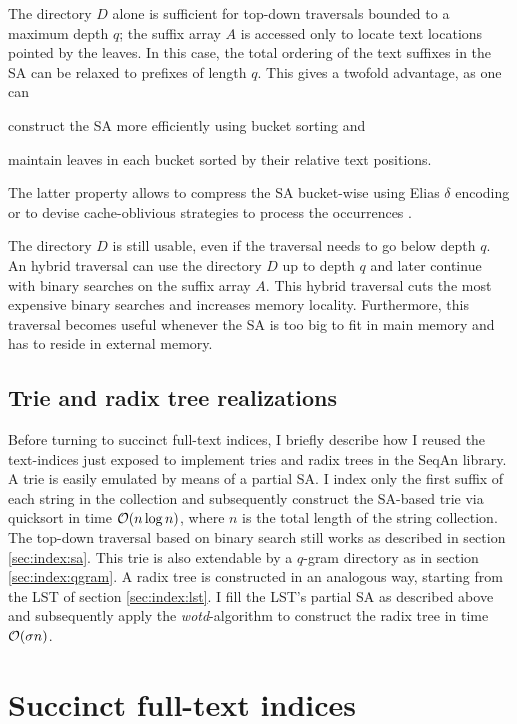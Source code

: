 The directory $D$ alone is sufficient for top-down traversals bounded to a maximum depth $q$;
the suffix array $A$ is accessed only to locate text locations pointed by the leaves.
In this case, the total ordering of the text suffixes in the SA can be relaxed to prefixes of length $q$.
This gives a twofold advantage, as one can
\begin{inparaenum}[(i)]
\item construct the SA more efficiently using bucket sorting and
\item maintain leaves in each bucket sorted by their relative text positions.
\end{inparaenum}
The latter property allows to compress the SA bucket-wise \eg using Elias $\delta$ encoding \citep{Elias1975} or to devise cache-oblivious strategies to process the occurrences \citep{Hach2010}.

The directory $D$ is still usable, even if the traversal needs to go below depth $q$.
An hybrid traversal can use the directory $D$ up to depth $q$ and later continue with binary searches on the suffix array $A$.
This hybrid traversal cuts the most expensive binary searches and increases memory locality.
Furthermore, this traversal becomes useful whenever the SA is too big to fit in main memory and has to reside in external memory.

\subsection{Trie and radix tree realizations}
\label{sec:index:trie}

Before turning to succinct full-text indices, I briefly describe how I reused the text-indices just exposed to implement tries and radix trees in the SeqAn library.
A trie is easily emulated by means of a partial SA.
I index only the first suffix of each string in the collection and subsequently construct the SA-based trie via quicksort in time $\mathcal{O}(n \log n)$, where $n$ is the total length of the string collection.
The top-down traversal based on binary search still works as described in section \ref{sec:index:sa}.
This trie is also extendable by a $q$-gram directory as in section \ref{sec:index:qgram}.
A radix tree is constructed in an analogous way, starting from the LST of section \ref{sec:index:lst}.
I fill the LST's partial SA as described above and subsequently apply the \emph{wotd}-algorithm \citep{Giegerich1999} to construct the radix tree in time $\mathcal{O}(\sigma n)$.


\section{Succinct full-text indices}

